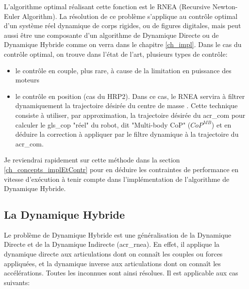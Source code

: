 \documentclass{report}
\begin{document}
L'algorithme optimal réalisant cette fonction est le RNEA (Recursive Newton-Euler Algorithm). La résolution de ce problème s'applique au contrôle optimal d'un système réel dynamique de corps rigides, ou de figures digitales, mais peut aussi être une composante d'un algorithme de Dynamique Directe ou de Dynamique Hybride comme on verra dans le chapitre \ref{ch_impl}. Dans le cas du contrôle optimal, on trouve dans l'état de l'art, plusieurs types de contrôle:
\begin{itemize}
\item le contrôle en couple, plus rare, à cause de la limitation en puissance des moteurs
\item le contrôle en position (cas du HRP2). Dans ce cas, le RNEA servira à filtrer dynamiquement la trajectoire désirée du centre de masse \cite{bib_filtrageTrajectoireCoM}. Cette technique consiste à utiliser, par approximation, la trajectoire désirée du \gls{acr_com} pour calculer le \gls{gls_cop} "réel" du robot, dit "Multi-body CoP" ($CoP^{MB}$) et en déduire la correction à appliquer par le filtre dynamique à la trajectoire du \gls{acr_com}.
\end{itemize}

Je reviendrai rapidement sur cette méthode dans la section \ref{ch_concepts_implEtContr} pour en déduire les contraintes de performance en vitesse d'exécution à tenir compte dans l'implémentation de l'algorithme de Dynamique Hybride.

\subsection{La Dynamique Hybride}

Le problème de Dynamique Hybride est une généralisation de la Dynamique Directe et de la Dynamique Indirecte (\gls{acr_rnea}). En effet, il applique la dynamique directe aux articulations dont on connaît les couples ou forces appliquées, et la dynamique inverse aux articulations dont on connaît les accélérations. Toutes les inconnues sont ainsi résolues. Il est applicable aux cas suivants:
\end{document}
